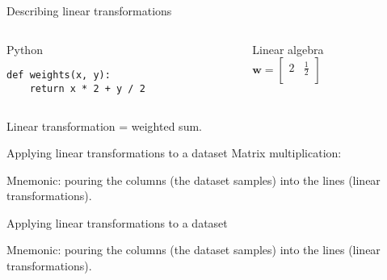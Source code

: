 \begin{frame}[fragile]{Describing linear transformations}
  \begin{columns}
    \begin{column}{0.5\textwidth}
      Python
\begin{verbatim}
def weights(x, y):
    return x * 2 + y / 2
\end{verbatim}
    \end{column}
    \begin{column}{0.5\textwidth}
      Linear algebra\\[.3cm]

      \(
      \mathbf{w} = \begin{bmatrix}
        2 & \frac{1}{2} \\
      \end{bmatrix}
      \)
    \end{column}
  \end{columns}
  \vfill
  Linear transformation = weighted sum.
\end{frame}

\begin{frame}{Applying linear transformations to a dataset}
  Matrix multiplication:


  Mnemonic: pouring the columns (the dataset samples) into the lines (linear transformations).
\end{frame}

\begin{frame}{Applying linear transformations to a dataset}


  Mnemonic: pouring the columns (the dataset samples) into the lines (linear transformations).
\end{frame}

